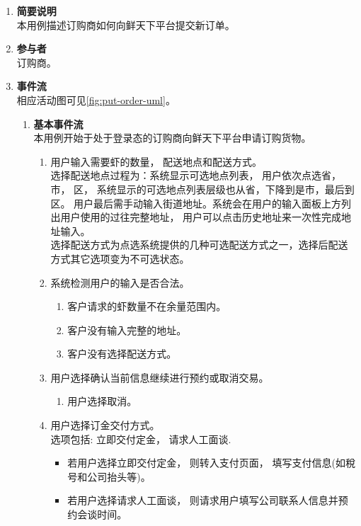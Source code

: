 \begin{enumerate}
	\item \textbf{简要说明}  \\ 本用例描述订购商如何向鲜天下平台提交新订单。
	\item \textbf{参与者} \\ 订购商。
	\item \textbf{事件流} \\ 相应活动图可见\autoref{fig:put-order-uml}。
	\begin{enumerate} 
        \item \textbf{基本事件流} \\ 本用例开始于处于登录态的订购商向鲜天下平台申请订购货物。
        \begin{enumerate}
            \item 用户输入需要虾的数量， 配送地点和配送方式。 \\ 
            选择配送地点过程为：系统显示可选地点列表， 用户依次点选省， 市， 区， 系统显示的可选地点列表层级也从省，下降到是市，最后到区。 用户最后需手动输入街道地址。系统会在用户的输入面板上方列出用户使用的过往完整地址，
            用户可以点击历史地址来一次性完成地址输入。 \\ 
            选择配送方式为点选系统提供的几种可选配送方式之一，选择后配送方式其它选项变为不可选状态。
            \item 系统检测用户的输入是否合法。
            \begin{enumerate}
                \item 客户请求的虾数量不在余量范围内。
                \item 客户没有输入完整的地址。
                \item 客户没有选择配送方式。
            \end{enumerate}
            \item 用户选择确认当前信息继续进行预约或取消交易。
            \begin{enumerate}
                \item 用户选择取消。
            \end{enumerate}
            \item 用户选择订金交付方式。 \\ 选项包括: 立即交付定金， 请求人工面谈.
            \begin{itemize}
                \item 若用户选择立即交付定金， 则转入支付页面， 填写支付信息(如稅号和公司抬头等)。
                \item 若用户选择请求人工面谈， 则请求用户填写公司联系人信息并预约会谈时间。

\end{itemize}
\end{enumerate}
\end{enumerate}
\end{enumerate}
